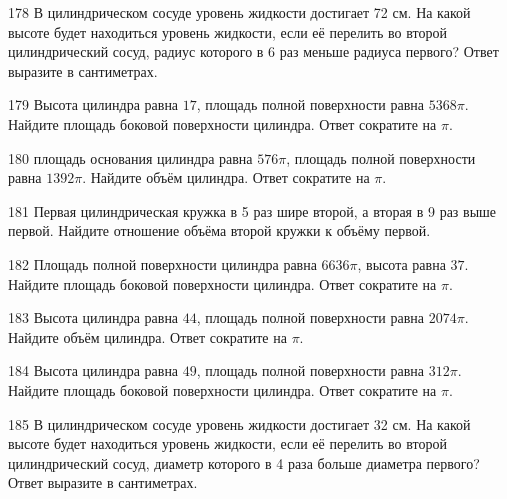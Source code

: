 \documentclass[4apaper]{article}
\begin{document}
\begin{taskBN}{178}
В цилиндрическом сосуде уровень жидкости достигает 72 см. На какой высоте будет находиться уровень жидкости, если её перелить во второй цилиндрический сосуд, радиус которого в 6 раз меньше радиуса первого? Ответ выразите в сантиметрах.
\end{taskBN}

\begin{taskBN}{179}
Высота цилиндра равна $17$, площадь полной поверхности равна $5368\pi$. Найдите площадь боковой поверхности цилиндра. Ответ сократите на $\pi$.
\end{taskBN}

\begin{taskBN}{180}
площадь основания цилиндра равна $576\pi$, площадь полной поверхности равна $1392\pi$. Найдите объём цилиндра. Ответ сократите на $\pi$.
\end{taskBN}

\begin{taskBN}{181}
 Первая цилиндрическая кружка в 5 раз шире второй, а вторая в 9 раз выше первой. Найдите отношение объёма второй кружки к объёму первой.
\end{taskBN}

\begin{taskBN}{182}
Площадь полной поверхности цилиндра равна $6636\pi$, высота равна $37$. Найдите площадь боковой поверхности цилиндра. Ответ сократите на $\pi$.
\end{taskBN}

\begin{taskBN}{183}
Высота цилиндра равна $44$, площадь полной поверхности равна $2074\pi$. Найдите объём цилиндра. Ответ сократите на $\pi$.
\end{taskBN}

\begin{taskBN}{184}
Высота цилиндра равна $49$, площадь полной поверхности равна $312\pi$. Найдите площадь боковой поверхности цилиндра. Ответ сократите на $\pi$.
\end{taskBN}

\begin{taskBN}{185}
В цилиндрическом сосуде уровень жидкости достигает 32 см. На какой высоте будет находиться уровень жидкости, если её перелить во второй цилиндрический сосуд, диаметр которого в 4 раза больше диаметра первого? Ответ выразите в сантиметрах.
\end{taskBN}
\end{document}
